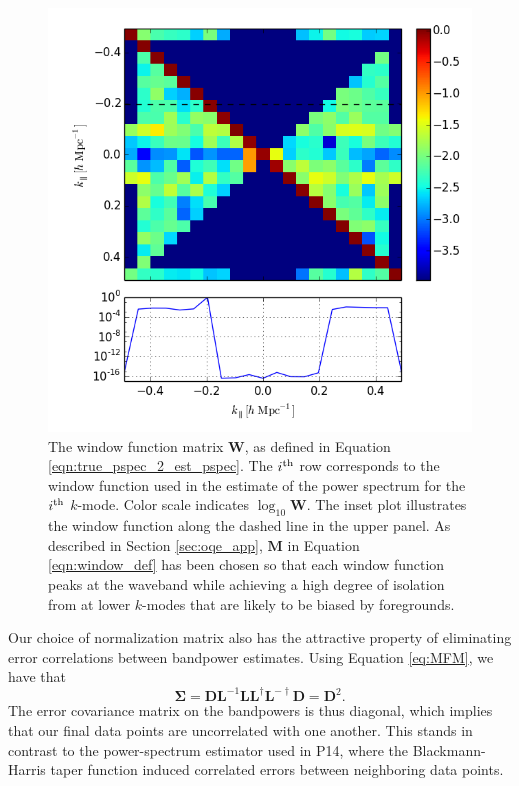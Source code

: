 \documentclass[twocolumn,numberedappendix]{emulateapj} \shorttitle{New Limits on the 21 cm Power Spectrum at $z=8.4$}
\begin{document}
\begin{figure}\centering
\includegraphics[width=\columnwidth]{plots/window.png}
\caption{
The window function matrix $\mathbf{W}$, as defined in Equation \eqref{eqn:true_pspec_2_est_pspec}.
The $i^{\rm th}$ row corresponds to the window function
used in the estimate of the power spectrum for the $i^{\rm th}$ $k$-mode.
Color scale indicates $\log_{10}\mathbf{W}$.
The inset plot illustrates the window function along the dashed line in the upper panel.
As described in Section \ref{sec:oqe_app}, $\mathbf{M}$ in Equation \eqref{eqn:window_def} has been chosen so that
each window function peaks at the waveband while achieving a high degree of isolation from
at lower $k$-modes that are likely to be biased by foregrounds.
}\label{fig:window_func}
\end{figure}

Our choice of normalization matrix also has the attractive property of eliminating error correlations
between bandpower estimates. Using Equation \eqref{eq:MFM}, we have
that \begin{equation} 
 \boldsymbol   \Sigma = \mathbf{D} \mathbf{L}^{-1}\mathbf{L}\mathbf{L}^{\dagger}\mathbf{L}^{-\dagger} \mathbf{D}
           = \mathbf{D}^2.
\end{equation}
The error covariance matrix on the bandpowers is thus diagonal, which implies
that our final data points are uncorrelated with one another. This stands in contrast to the power-spectrum estimator used in P14, where the Blackmann-Harris taper function induced correlated errors
between neighboring data points.
\end{document}
